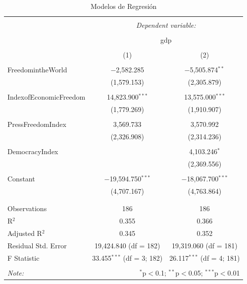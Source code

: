 \documentclass{article}
\begin{document}
\begin{table}[!htbp] \centering 
  \caption{Modelos de Regresión} 
  \label{} 
\begin{tabular}{@{\extracolsep{5pt}}lcc} 
\\[-1.8ex]\hline 
\hline \\[-1.8ex] 
 & \multicolumn{2}{c}{\textit{Dependent variable:}} \\ 
\cline{2-3} 
\\[-1.8ex] & \multicolumn{2}{c}{gdp} \\ 
\\[-1.8ex] & (1) & (2)\\ 
\hline \\[-1.8ex] 
 FreedomintheWorld & $-$2,582.285 & $-$5,505.874$^{**}$ \\ 
  & (1,579.153) & (2,305.879) \\ 
  & & \\ 
 IndexofEconomicFreedom & 14,823.900$^{***}$ & 13,575.000$^{***}$ \\ 
  & (1,779.269) & (1,910.907) \\ 
  & & \\ 
 PressFreedomIndex & 3,569.733 & 3,570.992 \\ 
  & (2,326.908) & (2,314.236) \\ 
  & & \\ 
 DemocracyIndex &  & 4,103.246$^{*}$ \\ 
  &  & (2,369.556) \\ 
  & & \\ 
 Constant & $-$19,594.750$^{***}$ & $-$18,067.700$^{***}$ \\ 
  & (4,707.167) & (4,763.864) \\ 
  & & \\ 
\hline \\[-1.8ex] 
Observations & 186 & 186 \\ 
R$^{2}$ & 0.355 & 0.366 \\ 
Adjusted R$^{2}$ & 0.345 & 0.352 \\ 
Residual Std. Error & 19,424.840 (df = 182) & 19,319.060 (df = 181) \\ 
F Statistic & 33.455$^{***}$ (df = 3; 182) & 26.117$^{***}$ (df = 4; 181) \\ 
\hline 
\hline \\[-1.8ex] 
\textit{Note:}  & \multicolumn{2}{r}{$^{*}$p$<$0.1; $^{**}$p$<$0.05; $^{***}$p$<$0.01} \\ 
\end{tabular} 
\end{table} 
\end{document}
